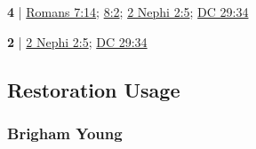 \begin{compactdesc}
		\item[spiritual law] \textbf{4} | \hyperref[ROMANS-7-14]{Romans 7:14}; \hyperref[ROMANS-8-2]{8:2}; \hyperref[2NEPHI-2-5]{2 Nephi 2:5}; \hyperref[DC29-34]{DC 29:34} %
			\begin{compactdesc}
				\item[Bible anchor verses] \phantom{.}
					\begin{compactdesc}
						\item[Romans 7:14]  \hyperref[PNEUMATIKOS]{} 
						\item[Romans 8:2] 
					\end{compactdesc}
			\end{compactdesc}
			
		\item[temporal law] \textbf{2} | \hyperref[2NEPHI-2-5]{2 Nephi 2:5}; \hyperref[DC29-34]{DC 29:34} %
		
	\end{compactdesc}
	

\subsection{Restoration Usage} %
	\label{LAW-RESTORATION}

	
	
	\subsubsection{Brigham Young} %
		\label{LAW-BY}
	
